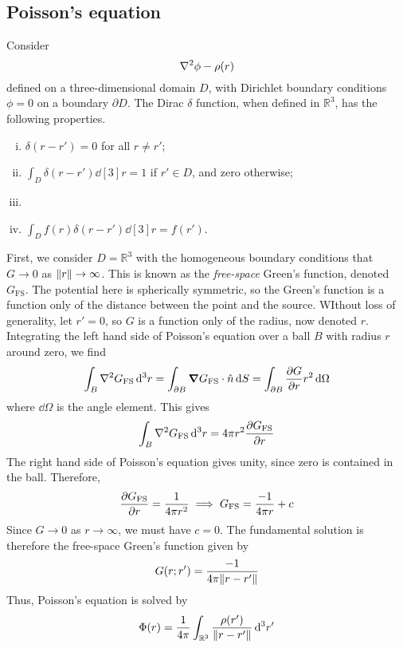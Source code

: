 \subsection{Poisson's equation}
Consider
\[
	\laplacian{\phi} - \rho(r)
\]
defined on a three-dimensional domain \( D \), with Dirichlet boundary conditions \( \phi = 0 \) on a boundary \( \partial D \).
The Dirac \( \delta \) function, when defined in \( \mathbb R^3 \), has the following properties.
\begin{enumerate}[(i)]
	\item \( \delta(r - r') = 0 \) for all \( r \neq r' \);
	\item \( \int_D \delta(r - r') \dd[3]{r} = 1 \) if \( r' \in D \), and zero otherwise;
	\item \item \( \int_D f(r) \delta(r - r') \dd[3]{r} = f(r') \).
\end{enumerate}
First, we consider \( D = \mathbb R^3 \) with the homogeneous boundary conditions that \( G \to 0 \) as \( \norm{r} \to \infty \).
This is known as the \textit{free-space} Green's function, denoted \( G_{\mathrm{FS}} \).
The potential here is spherically symmetric, so the Green's function is a function only of the distance between the point and the source.
WIthout loss of generality, let \( r' = 0 \), so \( G \) is a function only of the radius, now denoted \( r \).
Integrating the left hand side of Poisson's equation over a ball \( B \) with radius \( r \) around zero, we find
\[
	\int_B \laplacian{G_{\mathrm{FS}}} \dd[3]{r} = \int_{\partial B} \grad{G_{\mathrm{FS}}} \cdot \hat n \dd{S} = \int_{\partial B} \pdv{G}{r} r^2 \dd{\Omega}
\]
where \( \dd{\Omega} \) is the angle element.
This gives
\[
	\int_B \laplacian{G_{\mathrm{FS}}} \dd[3]{r} = 4 \pi r^2 \pdv{G_{\mathrm{FS}}}{r}
\]
The right hand side of Poisson's equation gives unity, since zero is contained in the ball.
Therefore,
\[
	\pdv{G_{\mathrm{FS}}}{r} = \frac{1}{4 \pi r^2} \implies G_{\mathrm{FS}} = \frac{-1}{4 \pi r} + c
\]
Since \( G \to 0 \) as \( r \to \infty \), we must have \( c = 0 \).
The fundamental solution is therefore the free-space Green's function given by
\[
	G(r; r') = \frac{-1}{4 \pi \norm{r - r'}}
\]
Thus, Poisson's equation is solved by
\[
	\Phi(r) = \frac{1}{4 \pi} \int_{\mathbb R^3} \frac{\rho(r')}{\norm{r - r'}} \dd[3]{r'}
\]

